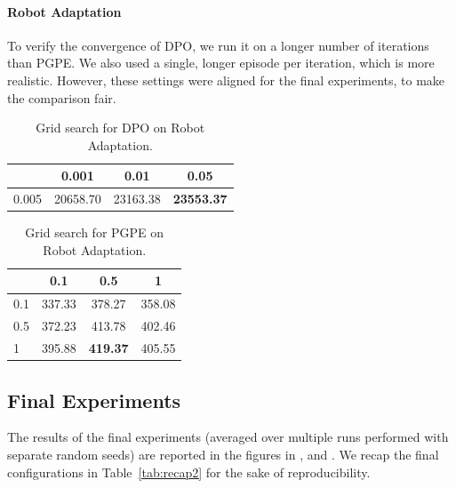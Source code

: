 \paragraph{Robot Adaptation}
To verify the convergence of \ac{DPO}, we run it on a longer number of iterations than \ac{PGPE}. We also used a single, longer episode per iteration, which is more realistic. However, these settings were aligned for the final experiments, to make the comparison fair.
\begin{table}[H]
	\centering
	\begin{tabular}{l|*{3}{c}}
		\toprule
		\backslashbox{$\alpha$}{$\lambda$}
		&0.001&0.01&0.05\\
		\midrule
		0.005 & 20658.70 & 23163.38 & \textbf{23553.37} \\
		\bottomrule
	\end{tabular} \caption{\label{tab:t4}Grid search for \ac{DPO} on Robot Adaptation.}
\end{table}
\begin{table}[H]
	\centering
	\begin{tabular}{l|*{3}{c}}
		\toprule
		\backslashbox{$\alpha$}{$\sigma$}
		&0.1&0.5&1\\
		\midrule
		0.1 & 337.33 & 378.27 & 358.08 \\
		0.5 & 372.23 & 413.78 & 402.46 \\
		1 & 395.88 & \textbf{419.37}	 & 405.55 \\
		\bottomrule
	\end{tabular} \caption{\label{tab:t5}Grid search for \ac{PGPE} on Robot Adaptation.}
\end{table}

\subsection{Final Experiments}
The results of the final experiments (averaged over multiple runs performed with separate random seeds) are reported in the figures in ,  and . 
We recap the final configurations in Table~\ref{tab:recap2} for the sake of reproducibility.

